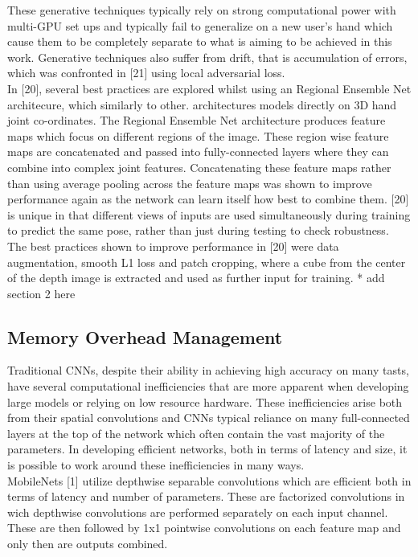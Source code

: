 \documentclass{article}
\begin{document}
These generative techniques typically rely on strong computational power with multi-GPU set ups and typically fail to generalize on a new user's hand which cause them to be completely separate to what is aiming to be achieved in this work. Generative techniques also suffer from drift, that is accumulation of errors, which was confronted in [21] using local adversarial loss.\\ 

In [20], several best practices are explored whilst using an Regional Ensemble Net architecure, which similarly to other. architectures models directly on 3D hand joint co-ordinates. The Regional Ensemble Net architecture produces feature maps which focus on different regions of the image. These region wise feature maps are concatenated and passed into fully-connected layers where they can combine into complex joint features. Concatenating these feature maps rather than using average pooling across the feature maps was shown to improve performance again as the network can learn itself how best to combine them. [20] is unique in that different views of inputs are used simultaneously during training to predict the same pose, rather than just during testing to check robustness. \\

The best practices shown to improve performance in [20] were data augmentation, smooth L1 loss and patch cropping, where a cube from the center of the depth image is extracted and used as further input for training. * add section 2 here

\subsection*{Memory Overhead Management}
Traditional CNNs, despite their ability in achieving high accuracy on many tasts, have several computational inefficiencies that are more apparent when developing large models or relying on low resource hardware. These inefficiencies  arise both from their spatial convolutions and CNNs typical reliance on many full-connected layers at the top of the network which often contain the vast majority of the parameters. In developing efficient networks, both in terms of latency and size, it is possible to work around these inefficiencies in many ways.\\

MobileNets [1] utilize depthwise separable convolutions which are efficient both in terms of latency  and number of parameters. These are factorized convolutions in wich depthwise convolutions are performed separately on each input channel. These are then followed by 1x1 pointwise convolutions on each feature map and only then are outputs combined.\\ 
\end{document}
